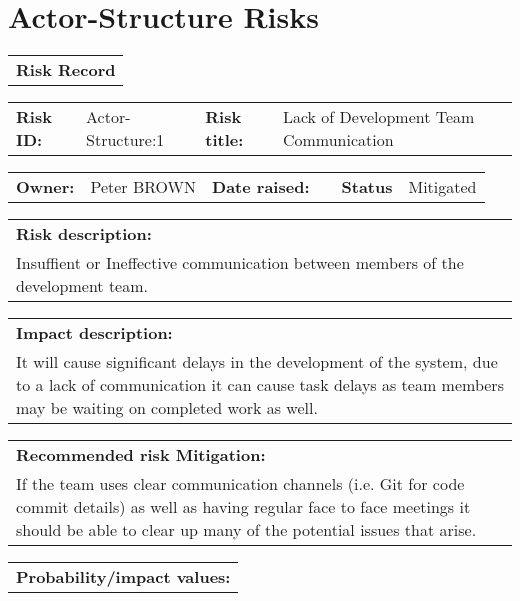 \FloatBarrier

\section{Actor-Structure Risks}
\label{Actor-Structure_Risks}

\FloatBarrier

\begin{table}%
	\begin{tabularx}{\textwidth}{| X |}
		\hline
		\textbf{Risk Record} \\
	\end{tabularx}
	\begin{tabularx}{\textwidth}{| l | X | l | X |}
		\hline
		\textbf{Risk ID:} & Actor-Structure:1 & \textbf{Risk title:} & Lack of Development Team Communication \\
	\end{tabularx}
	\begin{tabularx}{\textwidth}{| l | X | l | X | l | X |}
		\hline
		\textbf{Owner:} & Peter BROWN & \textbf{Date raised:} &  & \textbf{Status} & Mitigated \\
	\end{tabularx}
	\begin{tabularx}{\textwidth}{| X |}
		\hline
		\textbf{Risk description:} \\ Insuffient or Ineffective communication between members of the development team. \\
	\end{tabularx}
	\begin{tabularx}{\textwidth}{| X |}
		\hline
		\textbf{Impact description:} \\ It will cause significant delays in the development of the system, due to a lack of communication it can cause task delays as team members may be waiting on completed work as well. \\
	\end{tabularx}
	\begin{tabularx}{\textwidth}{| X |}
		\hline
		\textbf{Recommended risk Mitigation:} \\ If the team uses clear communication channels (i.e. Git for code commit details) as well as having regular face to face meetings it should be able to clear up many of the potential issues that arise.  \\
	\end{tabularx}
	\begin{tabularx}{\textwidth}{| X |}
		\hline
		\textbf{Probability/impact values:} \\

\end{tabularx}
\end{table}
